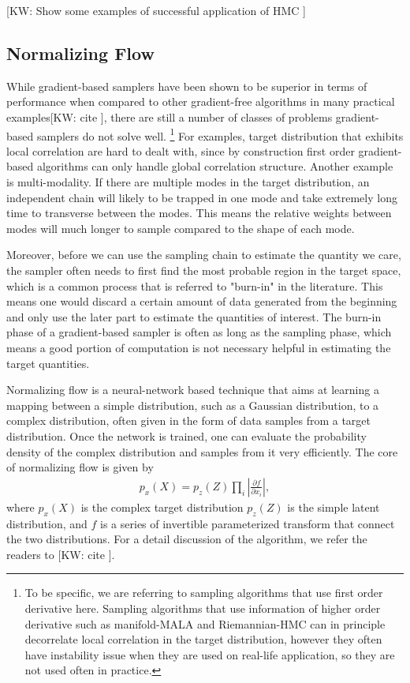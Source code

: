 \documentclass[twocolumn]{aastex631}
\newcommand{\kw}[1]{{\color{rb4}[KW: #1 ]}}
\begin{document}
\kw{Show some examples of successful application of HMC}

\subsection{Normalizing Flow}
\label{sec:flow}

While gradient-based samplers have been shown to be superior in terms of
performance when compared to other gradient-free algorithms in many practical
examples\kw{cite}, there are still a number of classes of problems
gradient-based samplers do not solve well. \footnote{To be specific, we are
referring to sampling algorithms that use first order derivative here. Sampling
algorithms that use information of higher order derivative such as manifold-MALA
and Riemannian-HMC can in principle decorrelate local correlation in the target
distribution, however they often have instability issue when they are used on
real-life application, so they are not used often in practice.} For examples,
target distribution that exhibits local correlation are hard to dealt with,
since by construction first order gradient-based algorithms can only handle
global correlation structure. Another example is multi-modality. If there are
multiple modes in the target distribution, an independent chain will likely to
be trapped in one mode and take extremely long time to transverse between the
modes. This means the relative weights between modes will much longer to sample
compared to the shape of each mode.

Moreover, before we can use the sampling chain to estimate the quantity we care,
the sampler often needs to first find the most probable region in the target
space, which is a common process that is referred to "burn-in" in the
literature. This means one would discard a certain amount of data generated from
the beginning and only use the later part to estimate the quantities of
interest. The burn-in phase of a gradient-based sampler is often as long as the
sampling phase, which means a good portion of computation is not necessary
helpful in estimating the target quantities.

Normalizing flow is a neural-network based technique that aims at learning a
mapping between a simple distribution, such as a Gaussian distribution, to a
complex distribution, often given in the form of data samples from a target
distribution. Once the network is trained, one can evaluate the probability
density of the complex distribution and samples from it very efficiently.
The core of normalizing flow is given by
\begin{align}
    p_x(X) = p_z(Z) \prod_i \left| \frac{\partial f}{\partial x_i}\right|,
\end{align}
where $p_x(X)$ is the complex target distribution $p_z(Z)$ is the simple latent
distribution, and $f$ is a series of invertible parameterized transform that
connect the two distributions. For a detail discussion of the algorithm, we
refer the readers to \kw{cite}.
\end{document}
